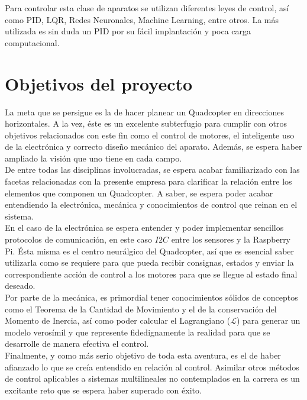 \documentclass[twoside,11pt]{report}
\begin{document}
Para controlar esta clase de aparatos se utilizan diferentes leyes de control, así como PID, LQR, Redes Neuronales, Machine Learning, entre otros. La más utilizada es sin duda un PID por su fácil implantación y poca carga computacional.

\section{Objetivos del proyecto}

La meta que se persigue es la de hacer planear un Quadcopter en direcciones horizontales. A la vez, éste es un excelente subterfugio para cumplir con otros objetivos relacionados con este fin como el control de motores, el inteligente uso de la electrónica y correcto diseño mecánico del aparato. Además, se espera haber ampliado la visión que uno tiene en cada campo. \\

De entre todas las disciplinas involucradas, se espera acabar familiarizado con las facetas relacionadas con la presente empresa para clarificar la relación entre los elementos que componen un Quadcopter.  A saber, se espera poder acabar entendiendo la electrónica, mecánica y conocimientos de control que reinan en el sistema. \\

En el caso de la electrónica se espera entender y poder implementar sencillos protocolos de comunicación, en este caso $I2C$ entre los sensores y la Raspberry Pi. Ésta misma es el centro neurálgico del Quadcopter, así que es esencial saber utilizarla como se requiere para que pueda recibir consignas, estados y enviar la correspondiente acción de control a los motores para que se llegue al estado final deseado. \\

Por parte de la mecánica, es primordial tener conocimientos sólidos de conceptos como el Teorema de la Cantidad de Movimiento y el de la conservación del Momento de Inercia, así como poder calcular el Lagrangiano ($\mathcal{L}$) para generar un modelo verosímil y que represente fidedignamente la realidad para que se desarrolle de manera efectiva el control. \\

Finalmente, y como más serio objetivo de toda esta aventura, es el de haber afianzado lo que se creía entendido en relación al control. Asimilar otros métodos de control aplicables a sistemas multilineales no contemplados en la carrera es un excitante reto que se espera haber superado con éxito. \\
\end{document}
